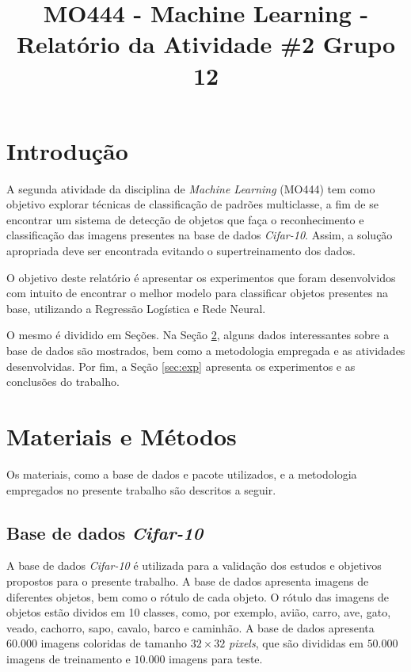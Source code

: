 \documentclass[conference]{IEEEtran}
\begin{document}
\title{MO444 - Machine Learning - Relatório da Atividade \#2 Grupo 12}

\author{
\and
{}
}

\maketitle

\section{Introdução}

A segunda atividade da disciplina de \textit{Machine Learning} (MO444) tem como objetivo explorar técnicas de classificação de padrões multiclasse, a fim de se encontrar um sistema de detecção de objetos que faça o reconhecimento e classificação das imagens presentes na base de dados \textit{Cifar-10}. Assim, a solução apropriada deve ser encontrada evitando o supertreinamento dos dados. 

O objetivo deste relatório é apresentar os experimentos que foram desenvolvidos com intuito de encontrar o melhor modelo para classificar objetos presentes na base, utilizando a Regressão Logística e Rede Neural.

O mesmo é dividido em Seções. Na Seção \ref{sec:meto}, alguns dados interessantes sobre a base de dados são mostrados, bem como a metodologia empregada e as atividades desenvolvidas. Por fim,  a Seção \ref{sec:exp} apresenta os experimentos e as conclusões do trabalho.

\section{Materiais e Métodos} \label{sec:meto}

Os materiais, como a base de dados e pacote utilizados, e a metodologia empregados no presente trabalho são descritos a seguir.

\subsection{Base de dados \textit{Cifar-10}} \label{sec:base}

A base de dados \emph{Cifar-10} é utilizada para a validação dos estudos e objetivos propostos para o presente trabalho. A base de dados apresenta imagens de diferentes objetos, bem como o rótulo de cada objeto. O rótulo das imagens de objetos estão dividos em 10 classes, como, por exemplo, avião, carro, ave, gato, veado, cachorro, sapo, cavalo, barco e caminhão. A base de dados apresenta $60.000$ imagens coloridas de tamanho $32 \times 32$ \textit{pixels}, que são  divididas em $50.000$ imagens de treinamento e $10.000$ imagens para teste.
\end{document}
